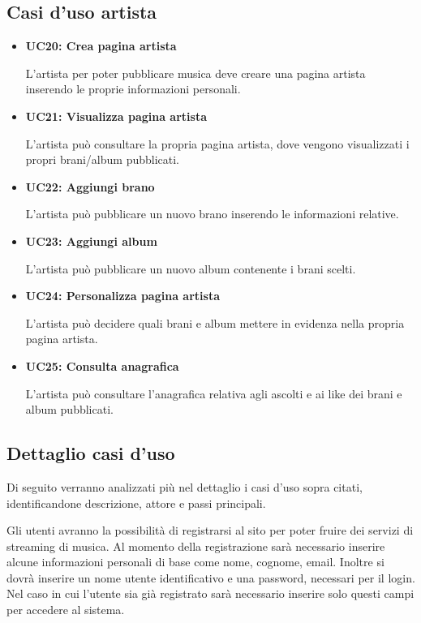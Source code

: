 \subsection{Casi d'uso artista}
\begin{itemize}
      \item \textbf{UC20: Crea pagina artista} 
      
      L'artista per poter pubblicare musica deve creare una pagina artista inserendo le proprie informazioni personali.
      \item  \textbf{UC21: Visualizza pagina artista} 
      
      L'artista può consultare la propria pagina artista, dove vengono visualizzati i propri brani/album pubblicati.
      \item  \textbf{UC22: Aggiungi brano} 
      
      L'artista può pubblicare un nuovo brano inserendo le informazioni relative.
      \item  \textbf{UC23: Aggiungi album} 
      
      L'artista può pubblicare un nuovo album contenente i brani scelti.
      \item  \textbf{UC24: Personalizza pagina artista} 
      
      L'artista può decidere quali brani e album mettere in evidenza nella propria pagina artista.
      \item  \textbf{UC25: Consulta anagrafica} 
      
      L'artista può consultare l'anagrafica relativa agli ascolti e ai like dei brani e album pubblicati.

\end{itemize}


\vspace{1cm}
\subsection{Dettaglio casi d'uso}
Di seguito verranno analizzati più nel dettaglio i casi d'uso sopra citati, 
identificandone descrizione, attore e passi principali.

Gli utenti avranno la possibilità di registrarsi al sito per poter fruire dei servizi di streaming di musica. 
Al momento della registrazione sarà necessario inserire alcune informazioni personali di base come nome, cognome, email. 
Inoltre si dovrà inserire un nome utente identificativo e una password, necessari per il login. Nel caso in cui l'utente 
sia già registrato sarà necessario inserire solo questi campi per accedere al sistema. 

